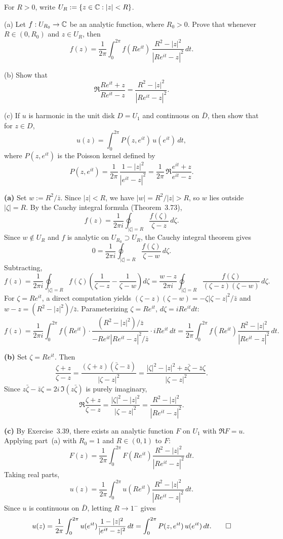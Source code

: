 \documentclass{article}
\begin{document}
For $R > 0$, write $U_R := \{z \in \mathbb{C} : |z| < R\}$.

(a) Let $f : U_{R_0} \to \mathbb{C}$ be an analytic function, where
$R_0 > 0$. Prove that whenever $R \in (0, R_0)$ and $z \in U_R$,
then
\[
  f(z) = \frac{1}{2\pi}\int_0^{2\pi}
  f(Re^{it})\,\frac{R^2 - |z|^2}{|Re^{it} - z|^2}\,dt.
\]

(b) Show that
\[
  \Re\frac{Re^{it} + z}{Re^{it} - z}
  = \frac{R^2 - |z|^2}{|Re^{it} - z|^2}.
\]

(c) If $u$ is harmonic in the unit disk $D = U_1$ and continuous
on $\bar{D}$, then show that for $z \in D$,
\[
  u(z) = \int_0^{2\pi} P(z, e^{it})\,u(e^{it})\,dt,
\]
where $P(z, e^{it})$ is the Poisson kernel defined by
\[
  P(z, e^{it})
  = \frac{1}{2\pi}\,\frac{1 - |z|^2}{|e^{it} - z|^2}
  = \frac{1}{2\pi}\,\Re\frac{e^{it} + z}{e^{it} - z}.
\]

\begin{solution}
  \textbf{(a)}\;
  Set $w := R^2/\bar{z}$.  Since $|z|<R$, we have
  $|w| = R^2/|z| > R$, so $w$ lies outside $|\zeta|=R$.
  By the Cauchy integral formula (Theorem~3.73),
  \[
    f(z) = \frac{1}{2\pi i}\oint_{|\zeta|=R}
    \frac{f(\zeta)}{\zeta - z}\,d\zeta.
  \]
  Since $w \notin U_R$ and $f$ is analytic on $U_{R_0}\supset U_R$,
  the Cauchy integral theorem gives
  \[
    0 = \frac{1}{2\pi i}\oint_{|\zeta|=R}
    \frac{f(\zeta)}{\zeta - w}\,d\zeta.
  \]
  Subtracting,
  \[
    f(z) = \frac{1}{2\pi i}\oint_{|\zeta|=R}f(\zeta)
    \left(\frac{1}{\zeta-z}-\frac{1}{\zeta-w}\right)d\zeta
    = \frac{w-z}{2\pi i}\oint_{|\zeta|=R}
    \frac{f(\zeta)}{(\zeta-z)(\zeta-w)}\,d\zeta.
  \]
  For $\zeta = Re^{it}$, a direct computation yields
  $(\zeta-z)(\zeta-w) = -\zeta|\zeta-z|^2/\bar{z}$ and
  $w-z = (R^2-|z|^2)/\bar{z}$.
  Parameterizing $\zeta = Re^{it}$, $d\zeta = iRe^{it}dt$:
  \[
    f(z) = \frac{1}{2\pi i}\int_0^{2\pi}
    f(Re^{it})\cdot
    \frac{(R^2-|z|^2)/\bar{z}}{-Re^{it}|Re^{it}-z|^2/\bar{z}}
    \cdot iRe^{it}\,dt
    = \frac{1}{2\pi}\int_0^{2\pi}
    f(Re^{it})\frac{R^2-|z|^2}{|Re^{it}-z|^2}\,dt.
  \]

  \medskip

  \textbf{(b)}\;
  Set $\zeta = Re^{it}$.  Then
  \[
    \frac{\zeta+z}{\zeta-z}
    = \frac{(\zeta+z)(\bar\zeta-\bar z)}{|\zeta-z|^2}
    = \frac{|\zeta|^2 - |z|^2 + z\bar\zeta - \bar z\zeta}
    {|\zeta-z|^2}.
  \]
  Since $z\bar\zeta-\bar z\zeta = 2i\,\Im(z\bar\zeta)$ is purely
  imaginary,
  \[
    \Re\frac{\zeta+z}{\zeta-z}
    = \frac{|\zeta|^2-|z|^2}{|\zeta-z|^2}
    = \frac{R^2-|z|^2}{|Re^{it}-z|^2}.
  \]

  \medskip

  \textbf{(c)}\;
  By Exercise~3.39, there exists an analytic function $F$ on
  $U_1$ with $\Re F = u$.
  Applying part~(a) with $R_0 = 1$ and $R \in (0,1)$ to $F$:
  \[
    F(z) = \frac{1}{2\pi}\int_0^{2\pi}
    F(Re^{it})\frac{R^2-|z|^2}{|Re^{it}-z|^2}\,dt.
  \]
  Taking real parts,
  \[
    u(z) = \frac{1}{2\pi}\int_0^{2\pi}
    u(Re^{it})\frac{R^2-|z|^2}{|Re^{it}-z|^2}\,dt.
  \]
  Since $u$ is continuous on $\bar{D}$, letting $R\to 1^-$ gives
  \[
    u(z) = \frac{1}{2\pi}\int_0^{2\pi}
    u(e^{it})\frac{1-|z|^2}{|e^{it}-z|^2}\,dt
    = \int_0^{2\pi}P(z,e^{it})\,u(e^{it})\,dt.\qedhere
  \]
\end{solution}
\end{document}
